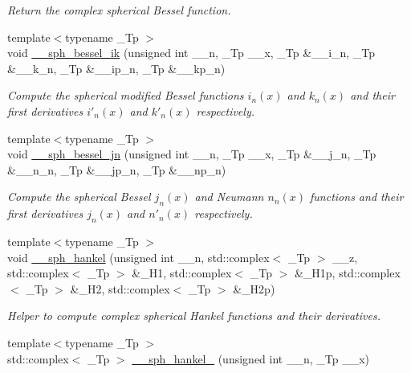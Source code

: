 \begin{DoxyCompactItemize}
\begin{DoxyCompactList}\small\item\em Return the complex spherical Bessel function. \end{DoxyCompactList}\item 
{\footnotesize template$<$typename \+\_\+\+Tp $>$ }\\void \hyperlink{namespacestd_1_1____detail_a35edea916ec9c8310f7d4a06618f7378}{\+\_\+\+\_\+sph\+\_\+bessel\+\_\+ik} (unsigned int \+\_\+\+\_\+n, \+\_\+\+Tp \+\_\+\+\_\+x, \+\_\+\+Tp \&\+\_\+\+\_\+i\+\_\+n, \+\_\+\+Tp \&\+\_\+\+\_\+k\+\_\+n, \+\_\+\+Tp \&\+\_\+\+\_\+ip\+\_\+n, \+\_\+\+Tp \&\+\_\+\+\_\+kp\+\_\+n)
\begin{DoxyCompactList}\small\item\em Compute the spherical modified Bessel functions $ i_n(x) $ and $ k_n(x) $ and their first derivatives $ i'_n(x) $ and $ k'_n(x) $ respectively. \end{DoxyCompactList}\item 
{\footnotesize template$<$typename \+\_\+\+Tp $>$ }\\void \hyperlink{namespacestd_1_1____detail_a4fb8d05af806e03645480c0fcb3a0a19}{\+\_\+\+\_\+sph\+\_\+bessel\+\_\+jn} (unsigned int \+\_\+\+\_\+n, \+\_\+\+Tp \+\_\+\+\_\+x, \+\_\+\+Tp \&\+\_\+\+\_\+j\+\_\+n, \+\_\+\+Tp \&\+\_\+\+\_\+n\+\_\+n, \+\_\+\+Tp \&\+\_\+\+\_\+jp\+\_\+n, \+\_\+\+Tp \&\+\_\+\+\_\+np\+\_\+n)
\begin{DoxyCompactList}\small\item\em Compute the spherical Bessel $ j_n(x) $ and Neumann $ n_n(x) $ functions and their first derivatives $ j_n(x) $ and $ n'_n(x) $ respectively. \end{DoxyCompactList}\item 
{\footnotesize template$<$typename \+\_\+\+Tp $>$ }\\void \hyperlink{namespacestd_1_1____detail_ae666168f9ede5a09dbae92598b7b14e4}{\+\_\+\+\_\+sph\+\_\+hankel} (unsigned int \+\_\+\+\_\+n, std\+::complex$<$ \+\_\+\+Tp $>$ \+\_\+\+\_\+z, std\+::complex$<$ \+\_\+\+Tp $>$ \&\+\_\+\+H1, std\+::complex$<$ \+\_\+\+Tp $>$ \&\+\_\+\+H1p, std\+::complex$<$ \+\_\+\+Tp $>$ \&\+\_\+\+H2, std\+::complex$<$ \+\_\+\+Tp $>$ \&\+\_\+\+H2p)
\begin{DoxyCompactList}\small\item\em Helper to compute complex spherical Hankel functions and their derivatives. \end{DoxyCompactList}\item 
{\footnotesize template$<$typename \+\_\+\+Tp $>$ }\\std\+::complex$<$ \+\_\+\+Tp $>$ \hyperlink{namespacestd_1_1____detail_adcc174fe4cb03d428f19abcae8012b50}{\+\_\+\+\_\+sph\+\_\+hankel\+\_} (unsigned int \+\_\+\+\_\+n, \+\_\+\+Tp \+\_\+\+\_\+x)

\end{DoxyCompactItemize}
